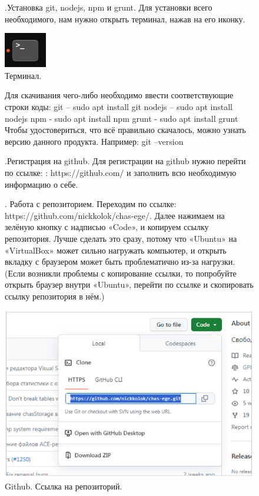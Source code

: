 \documentclass[oneside,final,12pt]{extarticle} %
\begin{document}
\begin{figure}
.\quad Установка git, nodejs, npm и grunt.
\newline Для установки всего необходимого, нам нужно открыть терминал, нажав на его иконку.  
		
		\centering
		\includegraphics[width=0.1\linewidth]{img/5.png}
\caption{Терминал.}
\label{ris:image}
\end{figure}

\begin{figure}
\quad Для скачивания чего-либо необходимо ввести соответствующие строки коды:
\newline git – sudo apt install git
\newline nodejs – sudo apt install nodejs
\newline npm - sudo apt install npm
\newline grunt - sudo apt install grunt
\newline Чтобы удостовериться, что всё правильно скачалось, можно узнать версию данного продукта. Например: git –version
\end{figure}

\begin{figure}
.\quad  Регистрация на github.
\newline \quad Для регистрации на github нужно перейти по ссылке: : https://github.com/ и заполнить всю необходимую информацию о себе.
\end{figure}

\begin{figure}
. \quad Работа с репозиторием.
\newline \quad Переходим по ссылке: https://github.com/nickkolok/chas-ege/. Далее нажимаем на зелёную кнопку с надписью «Code», и копируем ссылку репозитория. Лучше сделать это сразу, потому что «Ubuntu» на «VirtualBox» может сильно нагружать компьютер, и открыть вкладку с браузером может быть проблематично из-за нагрузки. (Если возникли проблемы с копирование ссылки, то попробуйте открыть браузер внутри «Ubuntu», перейти по ссылке и скопировать ссылку репозитория в нём.)

		\centering
		\includegraphics[width=0.65\linewidth]{img/6.png}
\caption{Github. Ссылка на репозиторий.}
\label{ris:image}
\end{figure}
\end{document}
